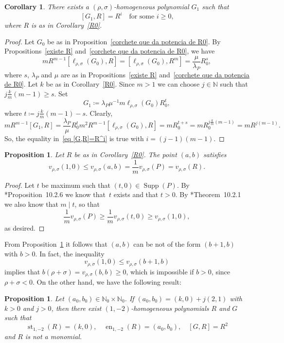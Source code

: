 \documentclass[reqno,a4paper]{amsart}
\newtheorem{proposition}[theorem]{Proposition}
\newtheorem{corollary}[theorem]{Corollary}
\theoremstyle{definition}
\theoremstyle{remark}
\DeclareMathOperator{\Supp}{Supp}
\DeclareMathOperator{\en}{en}
\DeclareMathOperator{\st}{st}
\begin{document}
\begin{corollary}\label{[G,R]=R^i} There exists a $(\rho,\sigma)$-homogeneous polynomial $G_1$ such that
\begin{equation}\label{eq [G,R]=R^i}
[G_1,R]= R^i \quad\text{for some $i\ge 0$,}
\end{equation}
where $R$ is as in Corollary~\ref{R0}.
\end{corollary}

\begin{proof} Let $G_0$ be as in Proposition~\ref{corchete que da potencia de R0}. By Propositions~\ref{existe R} and~\ref{corchete que da potencia de R0}, we have
$$
m R^{m-1}[\ell_{\rho,\sigma}(G_0),R]=[\ell_{\rho,\sigma}(G_0),R^m] =\frac{\mu}{\lambda_P} R_0^s,
$$
where $s$, $\lambda_P$ and $\mu$ are as in Propositions~\ref{existe R} and~\ref{corchete que da potencia de R0}. Let $k$ be as in Corollary~\ref{R0}. Since $m>1$ we can choose $j\in \mathds{N}$ such that $j\frac{k}{m}(m-1)\ge s$. Set
$$
G_1\coloneqq  \lambda_P\mu^{-1}m\ell_{\rho,\sigma}(G_0)R_0^t,
$$
where $t\coloneqq  j\frac{k}{m}(m-1)-s$. Clearly,
$$
m R^{m-1}[G_1,R]= \frac{\lambda_P}{\mu} R_0^t m^2 R^{m-1}[\ell_{\rho,\sigma}(G_0),R] = mR_0^{t+s}=mR_0^{j\frac{k}{m}(m-1)} = mR^{j(m-1)}.
$$
So, the equality in~\eqref{eq [G,R]=R^i} is true with $i=(j-1)(m-1)$.
\end{proof}

\begin{proposition}\label{desigualdad} Let $R$ be as in Corollary~\ref{R0}. The point $(a,b)$ satisfies
$$
v_{\rho,\sigma}(1,0)\le v_{\rho,\sigma}(a,b)=\frac 1m v_{\rho,\sigma}(P)=v_{\rho,\sigma}(R).
$$
\end{proposition}

\begin{proof} Let $t$ be maximum such that $(t,0)\in \Supp(P)$. By \cite{vdE}*{Proposition~10.2.6} we know that~$t$ exists and that $t>0$. By \cite{vdE}*{Theorem~10.2.1} we also know that $m\mid t$, so that
$$
\frac 1m v_{\rho,\sigma}(P)\ge \frac 1m v_{\rho,\sigma}(t,0)\ge v_{\rho,\sigma}(1,0),
$$
as desired.
\end{proof}

From Proposition~\ref{desigualdad} it follows that $(a,b)$ can be not of the form $(b+1,b)$ with $b>0$. In fact, the inequality
$$
v_{\rho,\sigma}(1,0)\le v_{\rho,\sigma}(b+1,b)
$$
implies that $b(\rho+\sigma)=v_{\rho,\sigma}(b,b)\ge 0$, which is impossible if $b>0$, since $\rho+\sigma<0$. On the other hand, we have the following result:

\begin{proposition}\label{ejemplo} Let $(a_0,b_0)\in\mathds{N}_0\times \mathds{N}_0$. If $(a_0,b_0)=(k,0)+j(2,1)$ with $k>0$ and $j>0$, then there exist $(1,-2)$-homogeneous polynomials $R$ and $G$ such that
$$
\st_{1,-2}(R) = (k,0),\quad \en_{1,-2}(R)=(a_0,b_0),\quad [G,R]= R^2
$$
and $R$ is not a monomial.
\end{proposition}
\end{document}
